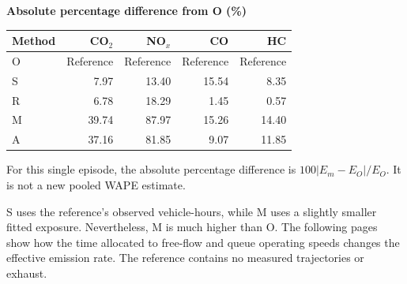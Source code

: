 \documentclass[10pt,a4paper]{article}
\newcommand{\notebox}[1]{\par\vspace{4pt}\begingroup\setlength{\fboxsep}{7pt}\colorbox{pale}{\parbox{\dimexpr\linewidth-14pt\relax}{#1}}\endgroup\par}
\begin{document}
\vspace{10pt}\textbf{Absolute percentage difference from O (\%)}\par
\par\noindent\begin{tabular*}{\linewidth}{@{\extracolsep{\fill}}lrrrr@{}}\toprule
Method & CO$_2$ & NO$_x$ & CO & HC\\\midrule
O & Reference & Reference & Reference & Reference\\\midrule[.3pt]
S & 7.97 & 13.40 & 15.54 & 8.35\\\midrule[.3pt]
R & 6.78 & 18.29 & 1.45 & 0.57\\\midrule[.3pt]
M & 39.74 & 87.97 & 15.26 & 14.40\\\midrule[.3pt]
A & 37.16 & 81.85 & 9.07 & 11.85\\\bottomrule\end{tabular*}\par
\vspace{8pt}For this single episode, the absolute percentage difference is $100|E_m-E_O|/E_O$. It is not a new pooled WAPE estimate.
\notebox{S uses the reference's observed vehicle-hours, while M uses a slightly smaller fitted exposure. Nevertheless, M is much higher than O. The following pages show how the time allocated to free-flow and queue operating speeds changes the effective emission rate. The reference contains no measured trajectories or exhaust.}
\end{document}
